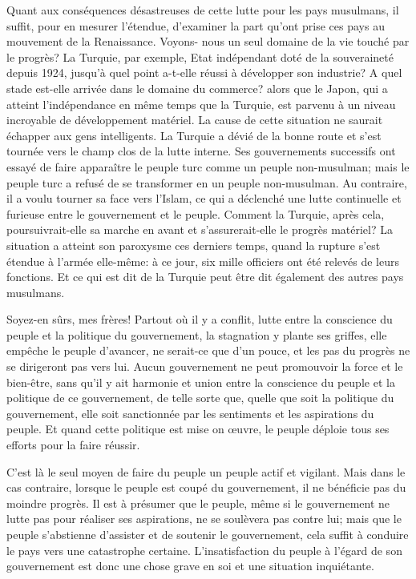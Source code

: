 Quant aux conséquences désastreuses de cette lutte pour les pays
musulmans, il suffit, pour en mesurer l'étendue, d'examiner la part
qu'ont prise ces pays au mouvement de la Renaissance. Voyons- nous un
seul domaine de la vie touché par le progrès? La Turquie, par exemple,
Etat indépendant doté de la souveraineté depuis 1924, jusqu'à quel point
a-t-elle réussi à développer son industrie? A quel stade est-elle
arrivée dans le domaine du commerce? alors que le Japon, qui a atteint
l'indépendance en même temps que la Turquie, est parvenu à un niveau
incroyable de développement matériel. La cause de cette situation ne
saurait échapper aux gens intelligents. La Turquie a dévié de la bonne
route et s'est tournée vers le champ clos de la lutte interne. Ses
gouvernements successifs ont essayé de faire apparaître le peuple turc
comme un peuple non-musulman; mais le peuple turc a refusé de se
transformer en un peuple non-musulman. Au contraire, il a voulu tourner
sa face vers l'Islam, ce qui a déclenché une lutte continuelle et
furieuse entre le gouvernement et le peuple. Comment la Turquie, après
cela, poursuivrait-elle sa marche en avant et s'assurerait-elle le
progrès matériel? La situation a atteint son paroxysme ces derniers
temps, quand la rupture s'est étendue à l'armée elle-même: à ce jour,
six mille officiers ont été relevés de leurs fonctions. Et ce qui est
dit de la Turquie peut être dit également des autres pays musulmans.

Soyez-en sûrs, mes frères! Partout où il y a conflit, lutte entre la
conscience du peuple et la politique du gouvernement, la stagnation y
plante ses griffes, elle empêche le peuple d'avancer, ne serait-ce que
d'un pouce, et les pas du progrès ne se dirigeront pas vers lui. Aucun
gouvernement ne peut promouvoir la force et le bien-être, sans qu'il y
ait harmonie et union entre la conscience du peuple et la politique de
ce gouvernement, de telle sorte que, quelle que soit la politique du
gouvernement, elle soit sanctionnée par les sentiments et les
aspirations du peuple. Et quand cette politique est mise on œuvre, le
peuple déploie tous ses efforts pour la faire réussir.

C'est là le seul moyen de faire du peuple un peuple actif et vigilant.
Mais dans le cas contraire, lorsque le peuple est coupé du gouvernement,
il ne bénéficie pas du moindre progrès. Il est à présumer que le peuple,
même si le gouvernement ne lutte pas pour réaliser ses aspirations, ne
se soulèvera pas contre lui; mais que le peuple s'abstienne d'assister
et de soutenir le gouvernement, cela suffit à conduire le pays vers une
catastrophe certaine. L'insatisfaction du peuple à l'égard de son
gouvernement est donc une chose grave en soi et une situation
inquiétante.

